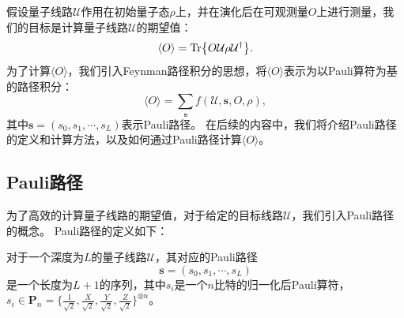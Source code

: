 假设量子线路$\mathcal{U}$作用在初始量子态$\rho$上，并在演化后在可观测量$O$上进行测量，我们的目标是计算量子线路$\mathcal{U}$的期望值：
\begin{equation}
    \langle O \rangle = \Tr{O \mathcal{U} \rho \mathcal{U}^\dagger}.
\end{equation}
为了计算$\langle O \rangle$，我们引入Feynman路径积分的思想，将$\langle O \rangle$表示为以Pauli算符为基的路径积分：
\begin{equation}
    \langle O \rangle = \sum_{\bm{s}} f(\mathcal{U},\bm{s},O,\rho),
\end{equation}
其中$\bm{s} = (s_0, s_1, \cdots, s_L)$表示Pauli路径。
在后续的内容中，我们将介绍Pauli路径的定义和计算方法，以及如何通过Pauli路径计算$\langle O \rangle$。

\subsection{Pauli路径}
为了高效的计算量子线路的期望值，对于给定的目标线路$\mathcal{U}$，我们引入Pauli路径的概念。
Pauli路径的定义如下：

\begin{definition}
    对于一个深度为$L$的量子线路$\mathcal{U}$，其对应的Pauli路径
    \begin{equation}
        \bm{s} = (s_0, s_1, \cdots, s_L)
    \end{equation}
    是一个长度为$L+1$的序列，其中$s_i$是一个$n$比特的归一化后Pauli算符，$s_i \in \bm{P}_n=\{\frac{\mathbb{I}}{\sqrt{2}},\frac{X}{\sqrt{2}},\frac{Y}{\sqrt{2}},\frac{Z}{\sqrt{2}}\}^{\otimes n}$。
\end{definition}




